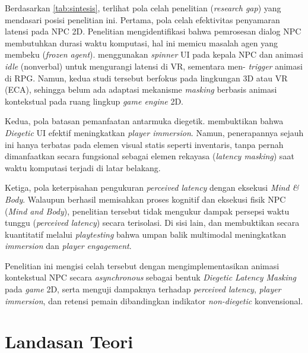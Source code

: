 Berdasarkan \cref{tab:sintesis}, terlihat pola celah penelitian (\textit{research gap}) yang mendasari posisi penelitian ini. Pertama, pola celah efektivitas penyamaran latensi pada NPC 2D. Penelitian \citet{siahaan2026retrieval} mengidentifikasi bahwa pemrosesan dialog NPC membutuhkan durasi waktu komputasi, hal ini memicu masalah agen yang membeku (\textit{frozen agent}). \citet{elfleet2024investigating} menggunakan \textit{spinner} UI pada kepala NPC dan animasi \textit{idle} (nonverbal) untuk mengurangi latensi di VR, sementara \citet{csepregi2021effect} men- \textit{trigger} animasi di RPG. Namun, kedua studi tersebut berfokus pada lingkungan 3D atau VR (ECA), sehingga belum ada adaptasi mekanisme \textit{masking} berbasis animasi kontekstual pada ruang lingkup \textit{game engine} 2D.

Kedua, pola batasan pemanfaatan antarmuka diegetik. \citet{andersson2024effects} membuktikan bahwa \textit{Diegetic} UI efektif meningkatkan \textit{player immersion}. Namun, penerapannya sejauh ini hanya terbatas pada elemen visual statis seperti inventaris, tanpa pernah dimanfaatkan secara fungsional sebagai elemen rekayasa (\textit{latency masking}) saat waktu komputasi terjadi di latar belakang.

Ketiga, pola keterpisahan pengukuran \textit{perceived latency} dengan eksekusi \textit{Mind \& Body}. Walaupun \citet{wei2025mind} berhasil memisahkan proses kognitif dan eksekusi fisik NPC (\textit{Mind and Body}), penelitian tersebut tidak mengukur dampak persepsi waktu tunggu (\textit{perceived latency}) secara terisolasi. Di sisi lain, \citet{elfleet2024investigating} dan \citet{csepregi2021effect} membuktikan secara kuantitatif melalui \textit{playtesting} bahwa umpan balik multimodal meningkatkan \textit{immersion} dan \textit{player engagement}.

Penelitian ini mengisi celah tersebut dengan mengimplementasikan animasi kontekstual NPC secara \textit{asynchronous} sebagai bentuk \textit{Diegetic Latency Masking} pada \textit{game} 2D, serta menguji dampaknya terhadap \textit{perceived latency}, \textit{player immersion}, dan retensi pemain dibandingkan indikator \textit{non-diegetic} konvensional.

\section{Landasan Teori}

